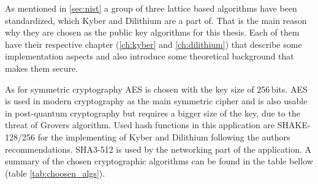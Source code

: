 As mentioned in \ref{sec:nist} a group of three lattice based algorithms have been standardized, which Kyber and Dilithium are a part of. That is the main reason why they are chosen as the public key algorithms for this thesis. Each of them have their respective chapter (\ref{ch:kyber} and \ref{ch:dilithium}) that describe some implementation aspects and also introduce some theoretical background that makes them secure.

As for symmetric cryptography AES is chosen with the key size of 256\,bits. AES is used in modern cryptography as the main symmetric cipher and is also usable in post-quantum cryptography but requires a bigger size of the key, due to the threat of Grovers algorithm. Used hash functions in this application are SHAKE-128/256 for the implementing of Kyber and Dilithium following the authors recommendations. SHA3-512 is used by the networking part of the application. A summary of the chosen cryptographic algorithms can be found in the table bellow (table \ref{tab:choosen_algs}).
